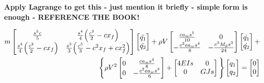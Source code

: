 \documentclass[11pt]{article}
\begin{document}
\textbf{Apply Lagrange to get this - just mention it briefly - simple form is enough - REFERENCE THE BOOK!}

\begin{gather}
\begin{split}
    m\begin{bmatrix} \frac{s^5c}{5} & \frac{s^4}{4}\Big{(}\frac{c^2}{2}-cx_f\Big{)} \\ \frac{s^4}{4}\Big{(}\frac{c^2}{2}-cx_f\Big{)} & \frac{s^3}{3}\Big{(}\frac{c^3}{3}-c^2x_f+cx_f^2\Big{)} \end{bmatrix} \begin{bmatrix}\ddot{q_1}\\ \ddot{q_2} \end{bmatrix} + \rho V \begin{bmatrix} \frac{ca_w s^5}{10} & 0 \\ -\frac{c^2e a_w s^4}{8} & -\frac{c^3M_{\dot\theta}s^3}{24} \end{bmatrix}\begin{bmatrix}\dot{q_1}\\ \dot{q_2}\end{bmatrix} +\\ \Bigg{\{}\rho V^2  \begin{bmatrix} 0 & \frac{ca_ws^4}{8} \\ 0 & -\frac{c^2ea_ws^3}{6} \end{bmatrix} + \begin{bmatrix} 4EIs & 0 \\ 0 & GJs \end{bmatrix} \Bigg{\}}\begin{bmatrix} q_1 \\ q_2 \end{bmatrix} = \begin{bmatrix} 0 \\ 0 \end{bmatrix}
\end{split}
\end{gather}

\end{document}
